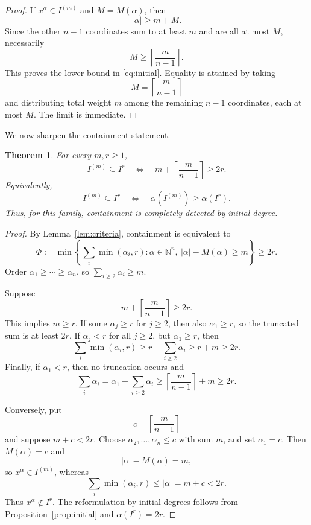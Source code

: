 \documentclass[11pt]{article}
\newtheorem{theorem}{Theorem}[section]
\newcommand{\NN}{\mathbb N}
\begin{document}
\begin{proof}
If \(x^\alpha\in I^{(m)}\) and \(M=M(\alpha)\), then
\[
 |\alpha|\ge m+M.
\]
Since the other \(n-1\) coordinates sum to at least \(m\) and are all
at most \(M\), necessarily
\[
 M\ge\left\lceil\frac{m}{n-1}\right\rceil.
\]
This proves the lower bound in \eqref{eq:initial}.  Equality is
attained by taking
\[
 M=\left\lceil\frac{m}{n-1}\right\rceil
\]
and distributing total weight \(m\) among the remaining \(n-1\)
coordinates, each at most \(M\).  The limit is immediate.
\end{proof}

We now sharpen the containment statement.

\begin{theorem}\label{thm:containment}
For every \(m,r\ge1\),
\begin{equation}\label{eq:containment}
 I^{(m)}\subseteq I^r
 \quad\Longleftrightarrow\quad
 m+\left\lceil\frac{m}{n-1}\right\rceil\ge2r.
\end{equation}
Equivalently,
\[
 I^{(m)}\subseteq I^r
 \quad\Longleftrightarrow\quad
 \alpha(I^{(m)})\ge\alpha(I^r).
\]
Thus, for this family, containment is completely detected by initial
degree.
\end{theorem}

\begin{proof}
By Lemma~\ref{lem:criteria}, containment is equivalent to
\[
 \Phi:=
 \min\left\{
 \sum_i\min(\alpha_i,r):
 \alpha\in\NN^n,\ |\alpha|-M(\alpha)\ge m
 \right\}\ge2r.
\]
Order \(\alpha_1\ge\cdots\ge\alpha_n\), so
\(\sum_{i\ge2}\alpha_i\ge m\).

Suppose
\[
 m+\left\lceil\frac{m}{n-1}\right\rceil\ge2r.
\]
This implies \(m\ge r\).  If some \(\alpha_j\ge r\) for \(j\ge2\),
then also \(\alpha_1\ge r\), so the truncated sum is at least \(2r\).
If \(\alpha_j<r\) for all \(j\ge2\), but \(\alpha_1\ge r\), then
\[
 \sum_i\min(\alpha_i,r)
 \ge r+\sum_{i\ge2}\alpha_i
 \ge r+m
 \ge2r.
\]
Finally, if \(\alpha_1<r\), then no truncation occurs and
\[
 \sum_i\alpha_i
 =
 \alpha_1+\sum_{i\ge2}\alpha_i
 \ge
 \left\lceil\frac{m}{n-1}\right\rceil+m
 \ge2r.
\]

Conversely, put
\[
 c=\left\lceil\frac{m}{n-1}\right\rceil
\]
and suppose \(m+c<2r\).  Choose
\(\alpha_2,\ldots,\alpha_n\le c\) with sum \(m\), and set
\(\alpha_1=c\).  Then \(M(\alpha)=c\) and
\[
 |\alpha|-M(\alpha)=m,
\]
so \(x^\alpha\in I^{(m)}\), whereas
\[
 \sum_i\min(\alpha_i,r)
 \le|\alpha|=m+c<2r.
\]
Thus \(x^\alpha\notin I^r\).
The reformulation by initial degrees follows from
Proposition~\ref{prop:initial} and \(\alpha(I^r)=2r\).
\end{proof}
\end{document}
